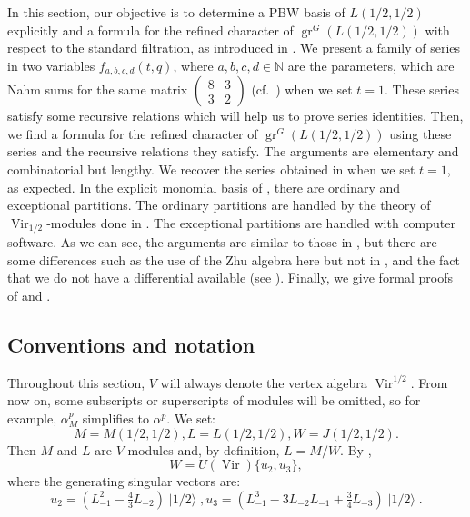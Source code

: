 \documentclass[a4paper, 12pt, reqno]{amsart}
\theoremstyle{remark}
\DeclareMathOperator{\Vir}{Vir}
\DeclareMathOperator{\gr}{gr}
\DeclareMathOperator{\vachalf}{|1/2\rangle}
\begin{document}
In this section, our objective is to determine a PBW basis of $L(1/2, 1/2)$ explicitly and a formula for the refined character of $\gr^G(L(1/2, 1/2))$ with respect to the standard filtration, as introduced in .
We present a family of series in two variables $f_{a, b, c, d}(t, q)$, where $a, b, c, d \in \mathbb{N}$ are the parameters, which are Nahm sums for the same matrix $\left(\begin{smallmatrix} 8 & 3 \\ 3 & 2 \end{smallmatrix}\right)$ (cf.\ \cite{Nahm2007}) when we set $t = 1$.
These series satisfy some recursive relations which will help us to prove series identities.
Then, we find a formula for the refined character of $\gr^G(L(1/2, 1/2))$ using these series and the recursive relations they satisfy.
The arguments are elementary and combinatorial but lengthy.
We recover the series obtained in \cite[Theorem 4]{andrews_singular_2022} when we set $t = 1$, as expected.
In the explicit monomial basis of , there are ordinary and exceptional partitions.
The ordinary partitions are handled by the theory of $\Vir_{1/2}$-modules done in .
The exceptional partitions are handled with computer software.
As we can see, the arguments are similar to those in \cite{andrews_singular_2022}, but there are some differences such as the use of the Zhu algebra here but not in \cite{andrews_singular_2022}, and the fact that we do not have a differential available (see ).
Finally, we give formal proofs of  and .

\subsection{Conventions and notation}
\label{sec:conventions-notation}

Throughout this section, $V$ will always denote the vertex algebra $\Vir^{1/2}$.
From now on, some subscripts or superscripts of modules will be omitted, so for example, $\alpha^p_M$ simplifies to $\alpha^p$.
We set:
\begin{equation*}
  M = M(1/2, 1/2), L = L(1/2, 1/2), W = J(1/2, 1/2).
\end{equation*}
Then $M$ and $L$ are $V$-modules and, by definition, $L = M/W$.
By ,
\begin{equation}
  \label{eq:50}
  W = U(\Vir)\{u_2, u_3\},
\end{equation}
where the generating singular vectors are:
\begin{equation}
  \label{eq:51}
  u_2 = (L_{-1}^2 - \tfrac{4}{3}L_{-2})\vachalf, u_3 = (L_{-1}^3 - 3L_{-2}L_{-1} + \tfrac{3}{4}L_{-3})\vachalf.
\end{equation}
\end{document}
